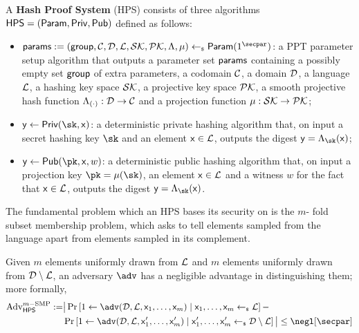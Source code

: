 \begin{definition}
	A \textbf{Hash Proof System} (HPS) consists of three algorithms ${\mathsf{HPS}} = ({\mathsf{Param}},{\mathsf{Priv}},{\mathsf{Pub}})$ defined as follows:
	\begin{itemize}
		\item $\HPSparams: = (\HPSgroup,\Codomain,\Domain,\Language,\SKSpace,\PKSpace,\HPSHash,\projectKey)  \getsr \HPSParam (1^\secpar)$: a PPT parameter setup algorithm that outputs a parameter set ${\mathsf{params}}$ containing a possibly empty set ${\mathsf{group}}$ of extra parameters, a codomain $\mathcal{C}$, a domain $\mathcal{D}$, a language $\mathcal{L}$, a hashing key space $\mathcal{SK}$, a projective key space $\mathcal{PK}$, a smooth projective hash function $\Lambda_{(\cdot)}: \mathcal{D} \rightarrow \mathcal{C}$ and a projection function $\mu: \mathcal{SK} \rightarrow \mathcal{PK}$;
		\item $\y \gets \HPSPrivEval (\sk,\x)$: a deterministic private hashing algorithm that, on input a secret hashing key $\sk$ and an element ${\mathsf{x}} \in \mathcal{L}$, outputs the digest $\y = \HPSHash_\sk(\x)$;
		\item $\y \gets \HPSPubEval (\pk,\x,w)$: a deterministic public hashing algorithm that, on input a projection key $\pk = \mu(\sk)$, an element ${\mathsf{x}} \in \mathcal{L}$ and a witness $w$ for the fact that ${\mathsf{x}} \in \mathcal{L}$, outputs the digest $\y = \HPSHash_\sk(\x)$.
	\end{itemize}
\end{definition}

The fundamental problem which an HPS bases its security on is the $m$- fold subset membership problem, which asks to tell elements sampled from the language apart from elements sampled in its complement.
\begin{problem}
	Given $m$ elements uniformly drawn from $\mathcal{L}$ and $m$ elements uniformly drawn from $\mathcal{D} \setminus \mathcal{L}$, an adversary $\adv$ has a negligible advantage in distinguishing them; more formally,
	\begin{align*} \AdvSMP :=  & \big| \Pr \left[ 1 \gets \adv(\Domain,\Language,\x_1,\dots,\x_m )  \mid \x_1,\dots,\x_m \getsr \Language \right] - \\
		&\Pr \left[ 1 \gets \adv(\Domain,\Language,\x_1',\dots,\x_m' )  \mid \x_1',\dots,\x_m' \getsr \Domain \setminus \Language \right] \big| \leq \negl[\secpar] 
		\end{align*}
\end{problem}


